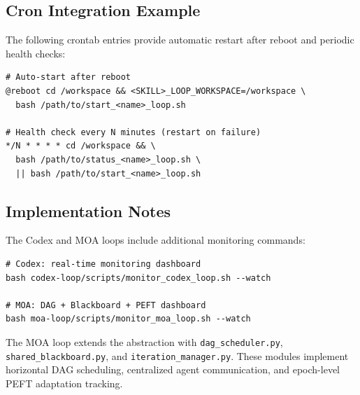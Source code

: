 \subsection{Cron Integration Example}

The following crontab entries provide automatic restart after reboot and periodic health checks:
\begin{verbatim}
# Auto-start after reboot
@reboot cd /workspace && <SKILL>_LOOP_WORKSPACE=/workspace \
  bash /path/to/start_<name>_loop.sh

# Health check every N minutes (restart on failure)
*/N * * * * cd /workspace && \
  bash /path/to/status_<name>_loop.sh \
  || bash /path/to/start_<name>_loop.sh
\end{verbatim}

\subsection{Implementation Notes}

The Codex and MOA loops include additional monitoring commands:
\begin{verbatim}
# Codex: real-time monitoring dashboard
bash codex-loop/scripts/monitor_codex_loop.sh --watch

# MOA: DAG + Blackboard + PEFT dashboard
bash moa-loop/scripts/monitor_moa_loop.sh --watch
\end{verbatim}

The MOA loop extends the abstraction with \texttt{dag\_scheduler.py}, \texttt{shared\_blackboard.py}, and \texttt{iteration\_manager.py}. These modules implement horizontal DAG scheduling, centralized agent communication, and epoch-level PEFT adaptation tracking.
